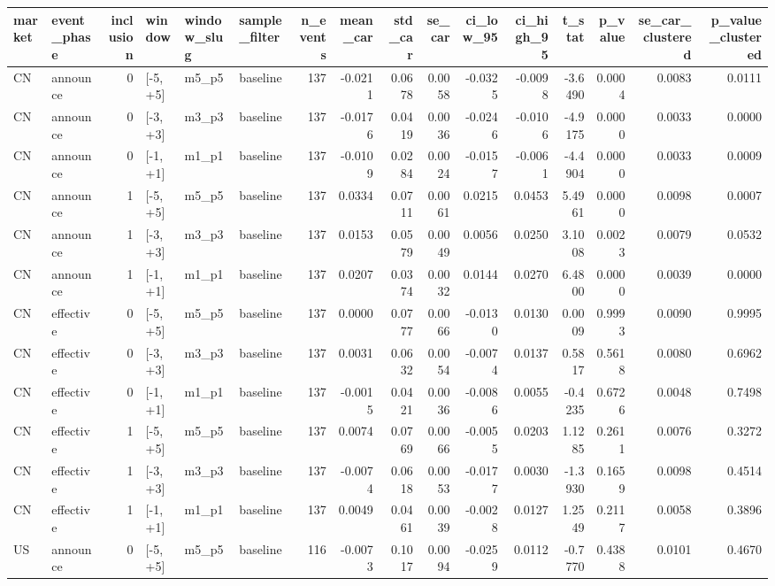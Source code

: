 \begin{tabular}{llrlllrrrrrrrrrr}
\toprule
market & event_phase & inclusion & window & window_slug & sample_filter & n_events & mean_car & std_car & se_car & ci_low_95 & ci_high_95 & t_stat & p_value & se_car_clustered & p_value_clustered \\
\midrule
CN & announce & 0 & [-5,+5] & m5_p5 & baseline & 137 & -0.0211 & 0.0678 & 0.0058 & -0.0325 & -0.0098 & -3.6490 & 0.0004 & 0.0083 & 0.0111 \\
CN & announce & 0 & [-3,+3] & m3_p3 & baseline & 137 & -0.0176 & 0.0419 & 0.0036 & -0.0246 & -0.0106 & -4.9175 & 0.0000 & 0.0033 & 0.0000 \\
CN & announce & 0 & [-1,+1] & m1_p1 & baseline & 137 & -0.0109 & 0.0284 & 0.0024 & -0.0157 & -0.0061 & -4.4904 & 0.0000 & 0.0033 & 0.0009 \\
CN & announce & 1 & [-5,+5] & m5_p5 & baseline & 137 & 0.0334 & 0.0711 & 0.0061 & 0.0215 & 0.0453 & 5.4961 & 0.0000 & 0.0098 & 0.0007 \\
CN & announce & 1 & [-3,+3] & m3_p3 & baseline & 137 & 0.0153 & 0.0579 & 0.0049 & 0.0056 & 0.0250 & 3.1008 & 0.0023 & 0.0079 & 0.0532 \\
CN & announce & 1 & [-1,+1] & m1_p1 & baseline & 137 & 0.0207 & 0.0374 & 0.0032 & 0.0144 & 0.0270 & 6.4800 & 0.0000 & 0.0039 & 0.0000 \\
CN & effective & 0 & [-5,+5] & m5_p5 & baseline & 137 & 0.0000 & 0.0777 & 0.0066 & -0.0130 & 0.0130 & 0.0009 & 0.9993 & 0.0090 & 0.9995 \\
CN & effective & 0 & [-3,+3] & m3_p3 & baseline & 137 & 0.0031 & 0.0632 & 0.0054 & -0.0074 & 0.0137 & 0.5817 & 0.5618 & 0.0080 & 0.6962 \\
CN & effective & 0 & [-1,+1] & m1_p1 & baseline & 137 & -0.0015 & 0.0421 & 0.0036 & -0.0086 & 0.0055 & -0.4235 & 0.6726 & 0.0048 & 0.7498 \\
CN & effective & 1 & [-5,+5] & m5_p5 & baseline & 137 & 0.0074 & 0.0769 & 0.0066 & -0.0055 & 0.0203 & 1.1285 & 0.2611 & 0.0076 & 0.3272 \\
CN & effective & 1 & [-3,+3] & m3_p3 & baseline & 137 & -0.0074 & 0.0618 & 0.0053 & -0.0177 & 0.0030 & -1.3930 & 0.1659 & 0.0098 & 0.4514 \\
CN & effective & 1 & [-1,+1] & m1_p1 & baseline & 137 & 0.0049 & 0.0461 & 0.0039 & -0.0028 & 0.0127 & 1.2549 & 0.2117 & 0.0058 & 0.3896 \\
US & announce & 0 & [-5,+5] & m5_p5 & baseline & 116 & -0.0073 & 0.1017 & 0.0094 & -0.0259 & 0.0112 & -0.7770 & 0.4388 & 0.0101 & 0.4670 \\

\end{tabular}
